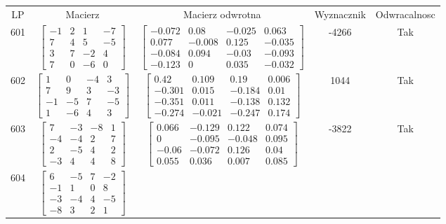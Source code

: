 \documentclass[a4paper,12pt]{article}
\begin{document}
\bgroup {} \vspace{0.2in} \begin{tabular}{c c c c c}
LP & Macierz & Macierz odwrotna & Wyznacznik & Odwracalnosc\\
601
&
$\begin{bmatrix} -1 & 2 & 1 & -7 \\ 7 & 4 & 5 & -5 \\ 3 & 7 & -2 & 4 \\ 7 & 0 & -6 & 0 \end{bmatrix}$
&
$\begin{bmatrix} -0.072 & 0.08 & -0.025 & 0.063 \\ 0.077 & -0.008 & 0.125 & -0.035 \\ -0.084 & 0.094 & -0.03 & -0.093 \\ -0.123 & 0 & 0.035 & -0.032 \end{bmatrix}$
&
-4266
&
Tak
\\
602
&
$\begin{bmatrix} 1 & 0 & -4 & 3 \\ 7 & 9 & 3 & -3 \\ -1 & -5 & 7 & -5 \\ 1 & -6 & 4 & 3 \end{bmatrix}$
&
$\begin{bmatrix} 0.42 & 0.109 & 0.19 & 0.006 \\ -0.301 & 0.015 & -0.184 & 0.01 \\ -0.351 & 0.011 & -0.138 & 0.132 \\ -0.274 & -0.021 & -0.247 & 0.174 \end{bmatrix}$
&
1044
&
Tak
\\
603
&
$\begin{bmatrix} 7 & -3 & -8 & 1 \\ -4 & -4 & 2 & 7 \\ 2 & -5 & 4 & 2 \\ -3 & 4 & 4 & 8 \end{bmatrix}$
&
$\begin{bmatrix} 0.066 & -0.129 & 0.122 & 0.074 \\ 0 & -0.095 & -0.048 & 0.095 \\ -0.06 & -0.072 & 0.126 & 0.04 \\ 0.055 & 0.036 & 0.007 & 0.085 \end{bmatrix}$
&
-3822
&
Tak
\\
604
&
$\begin{bmatrix} 6 & -5 & 7 & -2 \\ -1 & 1 & 0 & 8 \\ -3 & -4 & 4 & -5 \\ -8 & 3 & 2 & 1 \end{bmatrix}$

\end{tabular}
\end{document}
